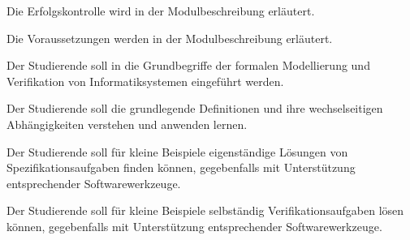 \begin{course}

\setdoclanguagegerman
{}



\coursehead


\label{cour_6057.dp_997}


\begin{styleenv}
\begin{assessment}
Die Erfolgskontrolle wird in der Modulbeschreibung erläutert.


\end{assessment}

\begin{conditions}Die Voraussetzungen werden in der Modulbeschreibung erläutert.

\end{conditions}


\end{styleenv}

\begin{learningoutcomes}
Der Studierende soll in die Grundbegriffe der formalen Modellierung und Verifikation von Informatiksystemen eingeführt werden.

 

Der Studierende soll die grundlegende Definitionen und ihre wechselseitigen Abhängigkeiten verstehen und anwenden lernen.

 

Der Studierende soll für kleine Beispiele eigenständige Lösungen von Spezifikationsaufgaben finden können, gegebenfalls mit Unterstützung entsprechender Softwarewerkzeuge.

 

Der Studierende soll für kleine Beispiele selbständig Verifikationsaufgaben lösen können, gegebenfalls mit Unterstützung entsprechender Softwarewerkzeuge.


\end{learningoutcomes}


\end{course}

